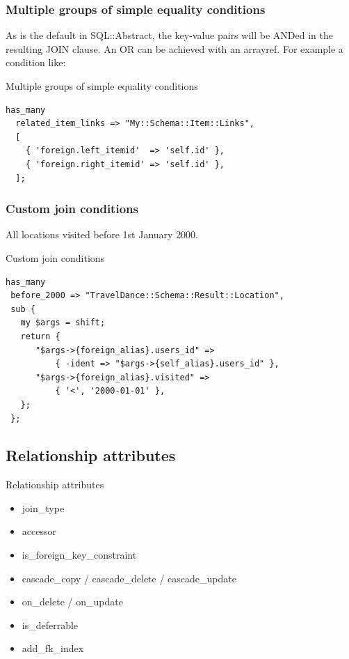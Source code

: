 \subsubsection{Multiple groups of simple equality conditions}

As is the default in SQL::Abstract, the key-value pairs will be ANDed in the
resulting JOIN clause. An OR can be achieved with an arrayref. For example a
condition like:

\begin{frame}[fragile]{Multiple groups of simple equality conditions}
\begin{lstlisting}
has_many
  related_item_links => "My::Schema::Item::Links",
  [
    { 'foreign.left_itemid'  => 'self.id' },
    { 'foreign.right_itemid' => 'self.id' },
  ];
\end{lstlisting}
\end{frame}

\subsubsection{Custom join conditions}

All locations visited before 1st January 2000.

\begin{frame}[fragile]{Custom join conditions}
\begin{lstlisting}
has_many
 before_2000 => "TravelDance::Schema::Result::Location",
 sub {
   my $args = shift;
   return {
      "$args->{foreign_alias}.users_id" =>
          { -ident => "$args->{self_alias}.users_id" },
      "$args->{foreign_alias}.visited" =>
          { '<', '2000-01-01' },
   };
 };
\end{lstlisting}
\end{frame}

\subsection{Relationship attributes}


\begin{frame}{Relationship attributes}
\begin{itemize}
\item join\_type
\item accessor
\item is\_foreign\_key\_constraint
\item cascade\_copy / cascade\_delete / cascade\_update
\item on\_delete / on\_update
\item is\_deferrable
\item add\_fk\_index
\end{itemize}
\end{frame}

